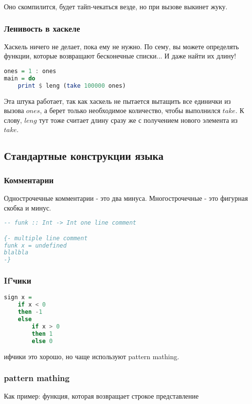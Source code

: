 \documentclass[10pt, a4paper]{article}
\begin{document}
Оно скомпилится, будет тайп-чекаться везде, но при вызове выкинет жуку.

\subsubsection{Ленивость в хаскеле}

Хаскель ничего не делает, пока ему не нужно. По сему, вы можете определять функции, которые возвращают бесконечные списки... И даже найти их длину!

\begin{lstlisting}[language=haskell]
ones = 1 : ones
main = do
    print $ leng (take 100000 ones)
\end{lstlisting}

Эта штука работает, так как хаскель не пытается вытащить все единички из вызова $ones$, а берет только необходимое количество, чтобы выполнился $take$. К слову, $leng$ тут тоже считает длину сразу же с получением нового элемента из $take$.

\subsection{Стандартные конструкции языка}

\subsubsection{Комментарии}
Однострочечные комментарии - это два минуса. Многострочечные - это фигурная скобка и минус.
\begin{lstlisting}[language=haskell]
-- funk :: Int -> Int one line comment

{- multiple line comment
funk x = undefined
blalbla
-}
\end{lstlisting}


\subsubsection{If'чики}
\begin{lstlisting}[language=haskell]
sign x = 
    if x < 0 
    then -1 
    else 
        if x > 0
        then 1 
        else 0
\end{lstlisting}

ифчики это хорошо, но чаще используют pattern mathing. 

\subsubsection{pattern mathing}
Как пример: функция, которая возвращает строкое представление
\end{document}
